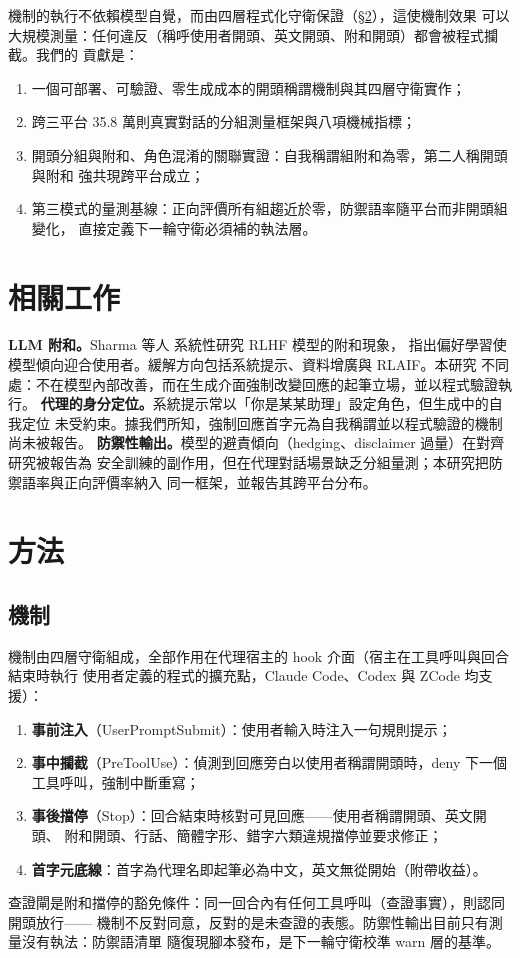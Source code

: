 \documentclass[10pt,twocolumn]{article}
\begin{document}
機制的執行不依賴模型自覺，而由四層程式化守衛保證（\S\ref{sec:method}），這使機制效果
可以大規模測量：任何違反（稱呼使用者開頭、英文開頭、附和開頭）都會被程式攔截。我們的
貢獻是：
\begin{enumerate}
  \item 一個可部署、可驗證、零生成成本的開頭稱謂機制與其四層守衛實作；
  \item 跨三平台 35.8 萬則真實對話的分組測量框架與八項機械指標；
  \item 開頭分組與附和、角色混淆的關聯實證：自我稱謂組附和為零，第二人稱開頭與附和
        強共現跨平台成立；
  \item 第三模式的量測基線：正向評價所有組趨近於零，防禦語率隨平台而非開頭組變化，
        直接定義下一輪守衛必須補的執法層。
\end{enumerate}

\section{相關工作}
\textbf{LLM 附和。}Sharma 等人 \cite{sharma2024towards} 系統性研究 RLHF 模型的附和現象，
指出偏好學習使模型傾向迎合使用者。緩解方向包括系統提示、資料增廣與 RLAIF。本研究
不同處：不在模型內部改善，而在生成介面強制改變回應的起筆立場，並以程式驗證執行。
\textbf{代理的身分定位。}系統提示常以「你是某某助理」設定角色，但生成中的自我定位
未受約束。據我們所知，強制回應首字元為自我稱謂並以程式驗證的機制尚未被報告。
\textbf{防禦性輸出。}模型的避責傾向（hedging、disclaimer 過量）在對齊研究被報告為
安全訓練的副作用，但在代理對話場景缺乏分組量測；本研究把防禦語率與正向評價率納入
同一框架，並報告其跨平台分布。

\section{方法}\label{sec:method}
\subsection{機制}
機制由四層守衛組成，全部作用在代理宿主的 hook 介面（宿主在工具呼叫與回合結束時執行
使用者定義的程式的擴充點，Claude Code、Codex 與 ZCode 均支援）：
\begin{enumerate}
  \item \textbf{事前注入}（UserPromptSubmit）：使用者輸入時注入一句規則提示；
  \item \textbf{事中攔截}（PreToolUse）：偵測到回應旁白以使用者稱謂開頭時，deny 下一個
        工具呼叫，強制中斷重寫；
  \item \textbf{事後擋停}（Stop）：回合結束時核對可見回應——使用者稱謂開頭、英文開頭、
        附和開頭、行話、簡體字形、錯字六類違規擋停並要求修正；
  \item \textbf{首字元底線}：首字為代理名即起筆必為中文，英文無從開始（附帶收益）。
\end{enumerate}
查證閘是附和擋停的豁免條件：同一回合內有任何工具呼叫（查證事實），則認同開頭放行——
機制不反對同意，反對的是未查證的表態。防禦性輸出目前只有測量沒有執法：防禦語清單
隨復現腳本發布，是下一輪守衛校準 warn 層的基準。
\end{document}

